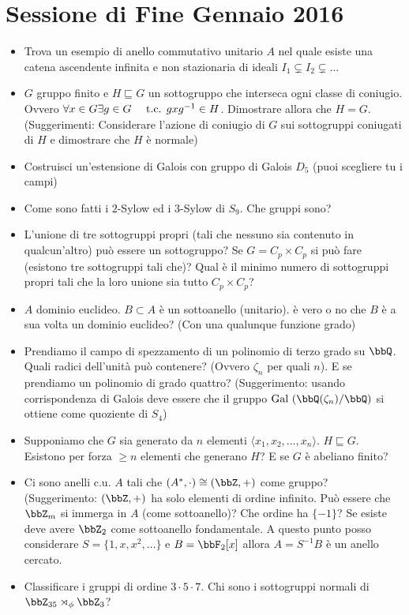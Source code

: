 \documentclass[a4paper,11pt,NoNotes,GeneralMath]{stdmdoc}
\newcommand{\sgr}{\sqsubseteq}
\begin{document}
	\section*{Sessione di Fine Gennaio 2016}
	\begin{itemize}
		\item Trova un esempio di anello commutativo unitario $A$ nel quale esiste una catena ascendente infinita e non stazionaria di ideali $I_1 \subsetneq I_2 \subsetneq \ldots$
		\item $G$ gruppo finito e $H \sgr G$ un sottogruppo che interseca ogni classe di coniugio. Ovvero $\forall x \in G \exists g \in G \quad \mbox{ t.c. } gxg^{-1} \in H$. Dimostrare allora che $H = G$. (Suggerimenti: Considerare l'azione di coniugio di $G$ sui sottogruppi coniugati di $H$ e dimostrare che $H$ è normale)
		\item Costruisci un'estensione di Galois con gruppo di Galois $D_5$ (puoi scegliere tu i campi)
		\item Come sono fatti i $2$-Sylow ed i $3$-Sylow di $S_9$. Che gruppi sono?
		\item L'unione di tre sottogruppi propri (tali che nessuno sia contenuto in qualcun'altro) può essere un sottogruppo? Se $G = C_p \times C_p$ si può fare (esistono tre sottogruppi tali che)? Qual è il minimo numero di sottogruppi propri tali che la loro unione sia tutto $C_p \times C_p$?
		\item $A$ dominio euclideo. $B \subset A$ è un sottoanello (unitario). è vero o no che $B$ è a sua volta un dominio euclideo? (Con una qualunque funzione grado)
		\item Prendiamo il campo di spezzamento di un polinomio di terzo grado su $\bbQ$. Quali radici dell'unità può contenere? (Ovvero $\zeta_n$ per quali $n$). E se prendiamo un polinomio di grado quattro? (Suggerimento: usando corrispondenza di Galois deve essere che il gruppo $\text{Gal }(\bbQ(\zeta_n) / \bbQ)$ si ottiene come quoziente di $S_4$)
		\item Supponiamo che $G$ sia generato da $n$ elementi $\langle x_1, x_2, \ldots, x_n \rangle$. $H \sgr G$. Esistono per forza $\ge n$ elementi che generano $H$? E se $G$ è abeliano finito?
		\item Ci sono anelli c.u. $A$ tali che $(A^{*}, \cdot) \cong (\bbZ, +)$ come gruppo? (Suggerimento: $(\bbZ, +)$ ha solo elementi di ordine infinito. Può essere che $\bbZ_m$ si immerga in $A$ (come sottoanello)? Che ordine ha $\{ -1 \}$? Se esiste deve avere $\bbZ_2$ come sottoanello fondamentale. A questo punto posso considerare $S = \{ 1, x, x^2, \ldots \}$ e $B = \bbF_2[x]$ allora $A = S^{-1}B$ è un anello cercato.
		\item Classificare i gruppi di ordine $3 \cdot 5 \cdot 7$. Chi sono i sottogruppi normali di $\bbZ_{35} \rtimes_\phi \bbZ_3$?
    \end{itemize}
    
\end{document}
